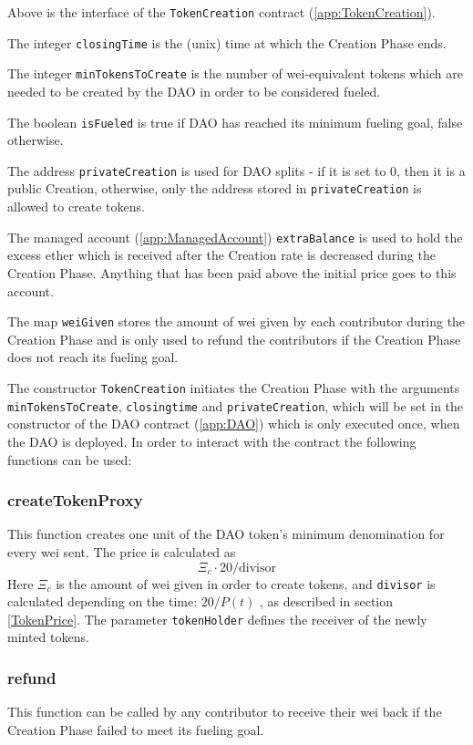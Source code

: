 \documentclass[9pt,oneside]{amsart}
\begin{document}
\begin{multicols}{2}
Above is the interface of the \verb|TokenCreation| contract (\ref{app:TokenCreation}).

The integer \verb|closingTime| is the (unix) time at which the Creation Phase ends.

The integer \verb|minTokensToCreate| is the number of wei-equivalent tokens which are needed to be created by the DAO in order to be considered fueled.

The boolean \verb|isFueled| is true if DAO has reached its minimum fueling goal, false otherwise.

The address \verb|privateCreation| is used for DAO splits - if it is set to 0, then it is a public Creation, otherwise, only the address stored in \verb|privateCreation| is allowed to create tokens.

The managed account (\ref{app:ManagedAccount}) \verb|extraBalance| is used to hold the excess ether which is received after the Creation rate is decreased during the Creation Phase. Anything that has been paid above the initial price goes to this account.

The map \verb|weiGiven| stores the amount of wei given by each contributor during the Creation Phase and is only used to refund the contributors if the Creation Phase does not reach its fueling goal.

The constructor \verb|TokenCreation| initiates the Creation Phase with the arguments \verb|minTokensToCreate|, \verb|closingtime| and \verb|privateCreation|, which will be set in the constructor of the DAO contract (\ref{app:DAO}) which is only executed once, when the DAO is deployed. 
In order to interact with the contract the following functions can be used:

\subsubsection*{createTokenProxy}
This function creates one unit of the DAO token’s minimum denomination for every wei sent. The price is calculated as $$\Xi_c \cdot 20 / \text{divisor}$$ Here $\Xi_c$ is the amount of wei given in order to create tokens, and \verb|divisor| is calculated depending on the time: $20 / P(t)$ , as described in section \ref{TokenPrice}.
The parameter \verb|tokenHolder| defines the receiver of the newly minted tokens. 

\subsubsection*{refund}
This function can be called by any contributor to receive their wei back if the Creation Phase failed to meet its fueling goal.


\end{multicols}
\end{document}
